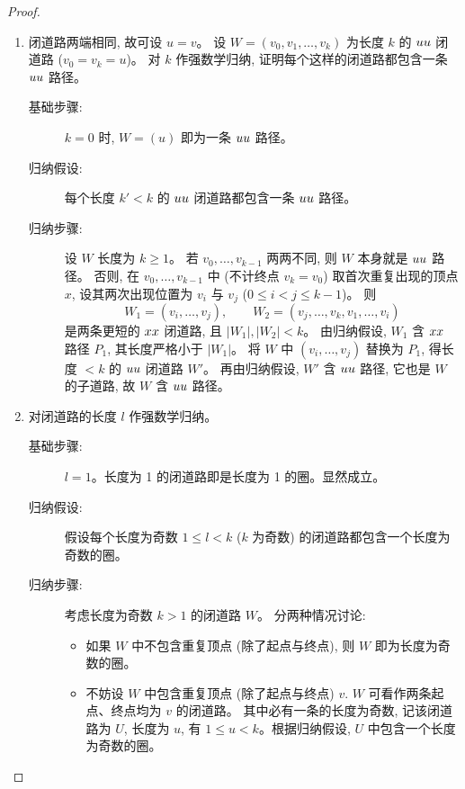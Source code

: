 \documentclass[a4paper, justified]{tufte-handout}
\begin{document}
\begin{proof}
  \begin{enumerate}[(1)]
    \item 闭道路两端相同, 故可设 $u = v$。
      设 $W = (v_0, v_1, \ldots, v_k)$ 为长度 $k$ 的 $u\-u$ 闭道路 ($v_0 = v_k = u$)。
      对 $k$ 作强数学归纳, 证明每个这样的闭道路都包含一条 $u\-u$ 路径。

      \begin{description}
        \item[基础步骤:] $k = 0$ 时, $W = (u)$ 即为一条 $u\-u$ 路径。
        \item[归纳假设:] 每个长度 $k' < k$ 的 $u\-u$ 闭道路都包含一条 $u\-u$ 路径。
        \item[归纳步骤:] 设 $W$ 长度为 $k \ge 1$。
          若 $v_0, \ldots, v_{k-1}$ 两两不同, 则 $W$ 本身就是 $u\-u$ 路径。
          否则, 在 $v_0, \ldots, v_{k-1}$ 中 (不计终点 $v_k = v_0$)
          取首次重复出现的顶点 $x$, 设其两次出现位置为 $v_i$ 与 $v_j$ ($0 \le i < j \le k-1$)。
          则
          \[
            W_1 = (v_i, \ldots, v_j), \qquad
            W_2 = (v_j, \ldots, v_k, v_1, \ldots, v_i)
          \]
          是两条更短的 $x\-x$ 闭道路, 且 $|W_1|, |W_2| < k$。
          由归纳假设, $W_1$ 含 $x\-x$ 路径 $P_1$, 其长度严格小于 $|W_1|$。
          将 $W$ 中 $(v_i, \ldots, v_j)$ 替换为 $P_1$, 得长度 $< k$ 的 $u\-u$ 闭道路 $W'$。
          再由归纳假设, $W'$ 含 $u\-u$ 路径, 它也是 $W$ 的子道路, 故 $W$ 含 $u\-u$ 路径。
      \end{description}

    \item 对闭道路的长度 $l$ 作强数学归纳。
      \begin{description}
        \item[基础步骤:] $l = 1$。长度为 1 的闭道路即是长度为 1 的圈。显然成立。
        \item[归纳假设:] 假设每个长度为奇数 $1 \le l < k$ ($k$ 为奇数)
          的闭道路都包含一个长度为奇数的圈。
        \item[归纳步骤:] 考虑长度为奇数 $k > 1$ 的闭道路 $W$。
          分两种情况讨论:
          \begin{itemize}
            \item 如果 $W$ 中不包含重复顶点 (除了起点与终点), 则 $W$ 即为长度为奇数的圈。
            \item 不妨设 $W$ 中包含重复顶点 (除了起点与终点) $v$.
              $W$ 可看作两条起点、终点均为 $v$ 的闭道路。
              其中必有一条的长度为奇数, 记该闭道路为 $U$, 长度为 $u$,
              有 $1 \le u < k$。根据归纳假设, $U$ 中包含一个长度为奇数的圈。
          \end{itemize}
      \end{description}
  \end{enumerate}
\end{proof}
\end{document}
